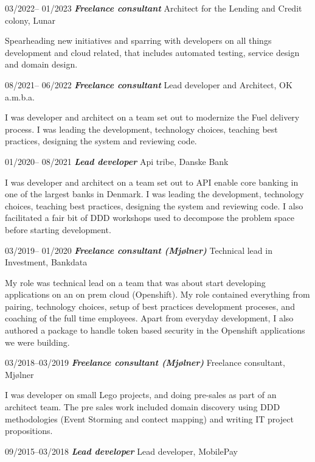 \documentclass[10pt,a4,sans]{article}
\begin{document}
\begin{CV}
    \item[03/2022-- 01/2023] \textbf{\emph{Freelance consultant}} Architect for the Lending and Credit colony, Lunar

Spearheading new initiatives and sparring with developers on all things development and cloud related, that includes automated testing, service design and domain design.

    \item[08/2021-- 06/2022] \textbf{\emph{Freelance consultant}} Lead developer and Architect, OK a.m.b.a.

I was developer and architect on a team set out to modernize the Fuel delivery process. I was leading the development, technology choices, teaching best practices, designing the system and reviewing code.      

    \item[01/2020-- 08/2021] \textbf{\emph{Lead developer}} Api tribe, Danske Bank

I was developer and architect on a team set out to API enable core banking in one of the largest banks in Denmark. I was leading the development, technology choices, teaching best practices, designing the system and reviewing code. I also facilitated a fair bit of DDD workshops used to decompose the problem space before starting development.

    \item[03/2019-- 01/2020] \textbf{\emph{Freelance consultant (Mjølner)}} Technical lead in Investment, Bankdata
    
My role was technical lead on a team that was about start developing applications on an on prem cloud (Openshift). My role contained everything from pairing, technology choices, setup of best practices development proceses, and coaching of the full time employees. Apart from everyday development, I also authored a package to handle token based security in the Openshift applications we were building.

    \item[03/2018--03/2019] \textbf{\emph{Freelance consultant (Mjølner)}} Freelance consultant, Mjølner
    
I was developer on small Lego projects, and doing pre-sales as part of an architect team. The pre sales work included domain discovery using DDD methodologies (Event Storming and contect mapping) and writing IT project propositions.
 
    \item[09/2015--03/2018] \textbf{\emph{Lead developer}} Lead developer, MobilePay 


\end{CV}
\end{document}
